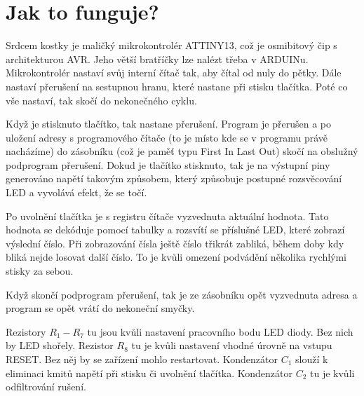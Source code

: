 \section*{Jak to funguje?}

Srdcem kostky je maličký mikrokontrolér ATTINY13, což je osmibitový čip s architekturou AVR. Jeho větší bratříčky lze nalézt třeba v ARDUINu. Mikrokontrolér nastaví svůj interní čítač tak, aby čítal od nuly do pětky. Dále nastaví přerušení na sestupnou hranu, které nastane při stisku tlačítka. Poté co vše nastaví, tak skočí do nekonečného cyklu.

Když je stisknuto tlačítko, tak nastane přerušení. Program je přerušen a po uložení adresy s programového čítače (to je místo kde se v programu právě nacházíme) do zásobníku (což je paměť typu First In Last Out) skočí na obslužný podprogram přerušení. Dokud je tlačítko stisknuto, tak je na výstupní piny generováno napětí takovým způsobem, který způsobuje postupné rozsvěcování LED a vyvolává efekt, že se točí.

Po uvolnění tlačítka je s registru čítače vyzvednuta aktuální hodnota. Tato hodnota se dekóduje pomocí tabulky a rozsvítí se příslušné LED, které zobrazí výslední číslo. Při zobrazování čísla ještě číslo třikrát zabliká, během doby kdy bliká nejde losovat další číslo. To je kvůli omezení podvádění několika rychlými stisky za sebou.

Když skončí podprogram přerušení, tak je ze zásobníku opět vyzvednuta adresa a program se opět vrátí do nekoneční smyčky.

Rezistory $R_1 - R_7$ tu jsou kvůli nastavení pracovního bodu LED diody. Bez nich by LED shořely. Rezistor $R_8$ tu je kvůli nastavení vhodné úrovně na vstupu RESET. Bez něj by se zařízení mohlo restartovat. Kondenzátor $C_1$ slouží k eliminaci kmitů napětí při stisku či uvolnění tlačítka. Kondenzátor $C_2$ tu je kvůli odfiltrování rušení.